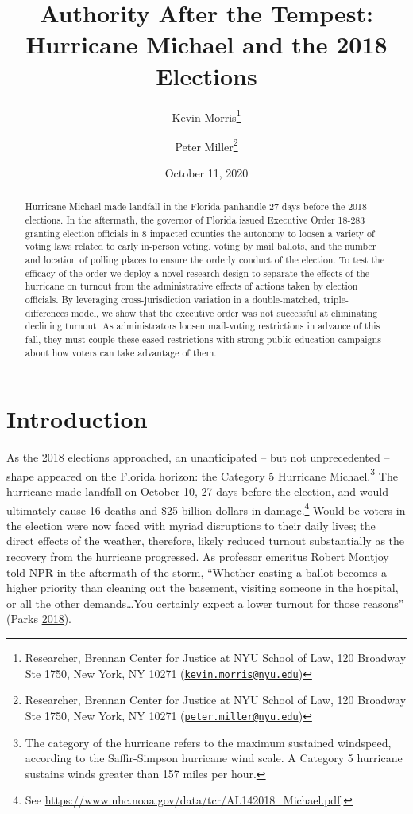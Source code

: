 \documentclass[
  12pt,
]{article}
\title{Authority After the Tempest: Hurricane Michael and the 2018 Elections}
\author{Kevin Morris\footnote{Researcher, Brennan Center for Justice at NYU School of Law, 120 Broadway Ste 1750, New York, NY 10271 (\href{mailto:kevin.morris@nyu.edu}{\nolinkurl{kevin.morris@nyu.edu}})} \and Peter Miller\footnote{Researcher, Brennan Center for Justice at NYU School of Law, 120 Broadway Ste 1750, New York, NY 10271 (\href{mailto:peter.miller@nyu.edu}{\nolinkurl{peter.miller@nyu.edu}})}}
\date{October 11, 2020}
\begin{document}
\maketitle
\begin{abstract}
Hurricane Michael made landfall in the Florida panhandle 27 days before the 2018 elections. In the aftermath, the governor of Florida issued Executive Order 18-283 granting election officials in 8 impacted counties the autonomy to loosen a variety of voting laws related to early in-person voting, voting by mail ballots, and the number and location of polling places to ensure the orderly conduct of the election. To test the efficacy of the order we deploy a novel research design to separate the effects of the hurricane on turnout from the administrative effects of actions taken by election officials. By leveraging cross-jurisdiction variation in a double-matched, triple-differences model, we show that the executive order was not successful at eliminating declining turnout. As administrators loosen mail-voting restrictions in advance of this fall, they must couple these eased restrictions with strong public education campaigns about how voters can take advantage of them.
\end{abstract}

\pagebreak

\doublespacing

\hypertarget{introduction}{%
\section*{Introduction}\label{introduction}}

As the 2018 elections approached, an unanticipated -- but not unprecedented -- shape appeared on the Florida horizon: the Category 5 Hurricane Michael.\footnote{The category of the hurricane refers to the maximum sustained windspeed, according to the Saffir-Simpson hurricane wind scale. A Category 5 hurricane sustains winds greater than 157 miles per hour.} The hurricane made landfall on October 10, 27 days before the election, and would ultimately cause 16 deaths and \$25 billion dollars in damage.\footnote{See \url{https://www.nhc.noaa.gov/data/tcr/AL142018_Michael.pdf}.} Would-be voters in the election were now faced with myriad disruptions to their daily lives; the direct effects of the weather, therefore, likely reduced turnout substantially as the recovery from the hurricane progressed. As professor emeritus Robert Montjoy told NPR in the aftermath of the storm, ``Whether casting a ballot becomes a higher priority than cleaning out the basement, visiting someone in the hospital, or all the other demands\ldots You certainly expect a lower turnout for those reasons'' (Parks \protect\hyperlink{ref-Parks2018}{2018}).
\end{document}
